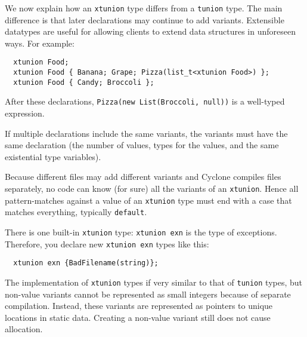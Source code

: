 We now explain how an \texttt{xtunion} type differs from a \texttt{tunion}
type.  The main difference is that later declarations may continue to
add variants.  Extensible datatypes are useful for allowing clients to
extend data structures in unforeseen ways.  For example:
\begin{verbatim}
  xtunion Food;
  xtunion Food { Banana; Grape; Pizza(list_t<xtunion Food>) };
  xtunion Food { Candy; Broccoli };
\end{verbatim}

After these declarations, \texttt{Pizza(new List(Broccoli, null))} is a
well-typed expression.

If multiple declarations include the same variants, the variants must
have the same declaration (the number of values, types for the values,
and the same existential type variables).

Because different files may add different variants and Cyclone
compiles files separately, no code can know (for sure) all the
variants of an \texttt{xtunion}. Hence all pattern-matches against a
value of an \texttt{xtunion} type must end with a case that matches
everything, typically \texttt{default}.

There is one built-in \texttt{xtunion} type: \texttt{xtunion exn} is the
type of exceptions.  Therefore, you declare new \texttt{xtunion exn}
types like this:

\begin{verbatim}
  xtunion exn {BadFilename(string)};
\end{verbatim}

The implementation of \texttt{xtunion} types if very similar to that of
\texttt{tunion} types, but non-value variants cannot be represented as
small integers because of separate compilation.  Instead, these
variants are represented as pointers to unique locations in static
data.  Creating a non-value variant still does not cause allocation.

